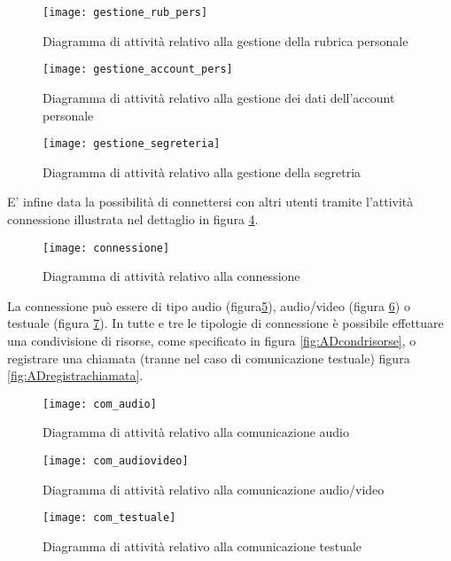 \begin{figure}[H]
\centering
\texttt{[image: gestione\_rub\_pers]}
\caption{Diagramma di attività relativo alla gestione della rubrica personale}\label{fig:ADgestionerubrica}
\end{figure}

\begin{figure}[H]
\centering
\texttt{[image: gestione\_account\_pers]}
\caption{Diagramma di attività relativo alla gestione dei dati dell'account personale}\label{fig:ADgestioneaccount}
\end{figure}

\begin{figure}[H]
\centering
\texttt{[image: gestione\_segreteria]}
\caption{Diagramma di attività relativo alla gestione della segretria}\label{fig:ADgestionesegreteria}
\end{figure}


E' infine data la possibilità di connettersi con altri utenti tramite l'attività connessione illustrata nel dettaglio in figura \ref{fig:ADconnessione}.

\begin{figure}[H]
\centering
\texttt{[image: connessione]}
\caption{Diagramma di attività relativo alla connessione}\label{fig:ADconnessione}
\end{figure}

La connessione può essere di tipo audio (figura\ref{fig:ADcomaudio}), audio/video (figura \ref{fig:ADcomaudiovideo}) o testuale (figura \ref{fig:ADcomtestuale}). In tutte e tre le tipologie di connessione è possibile effettuare una condivisione di risorse, come specificato in figura \ref{fig:ADcondrisorse}, o registrare una chiamata (tranne nel caso di comunicazione testuale) figura \ref{fig:ADregistrachiamata}.

\begin{figure}[H]
\centering
\texttt{[image: com\_audio]}
\caption{Diagramma di attività relativo alla comunicazione audio}\label{fig:ADcomaudio}
\end{figure}

\begin{figure}[H]
\centering
\texttt{[image: com\_audiovideo]}
\caption{Diagramma di attività relativo alla comunicazione audio/video}\label{fig:ADcomaudiovideo}
\end{figure}

\begin{figure}[H]
\centering
\texttt{[image: com\_testuale]}
\caption{Diagramma di attività relativo alla comunicazione testuale}\label{fig:ADcomtestuale}
\end{figure}

